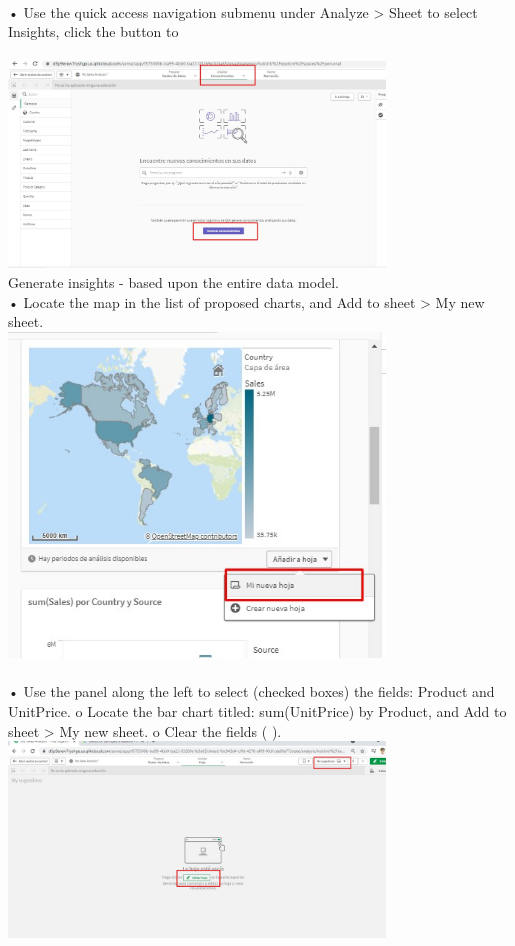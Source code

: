 \documentclass[preprint,12pt]{elsarticle}
\begin{document}
\begin{itemize}
	 			\\ • Use the quick access navigation submenu under Analyze > Sheet to select Insights, click the button to  \\
	 			 \\\includegraphics[width=10cm]{./IMAGENES/2.1} \\
	 			Generate insights - based upon the entire data model.
	 			\\ • Locate the map in the list of proposed charts, and Add to sheet > My new sheet. \\
	 			\includegraphics[width=10cm]{./IMAGENES/2.2} \\
	 			\\ • Use the panel along the left to select (checked boxes) the fields: Product and UnitPrice.
	 			o Locate the bar chart titled: sum(UnitPrice) by Product, and Add to sheet > My new sheet.
	 			o Clear the fields ( ).
	 			\includegraphics[width=10cm]{./IMAGENES/3.1} \\

\end{itemize}
\end{document}
